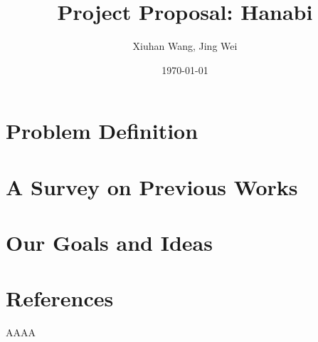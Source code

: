 \documentclass[12pt]{article}
\begin{document}
\title{\textbf{Project Proposal: Hanabi}}
\author{Xiuhan Wang, Jing Wei}
\date{\today}
\maketitle

\section{Problem Definition}

\section{A Survey on Previous Works}
\cite{AA01}

\section{Our Goals and Ideas}

\section*{References}
\begin{enumerate}[\lbrack 1\rbrack]
 AAAA
\end{enumerate}
\end{document}
